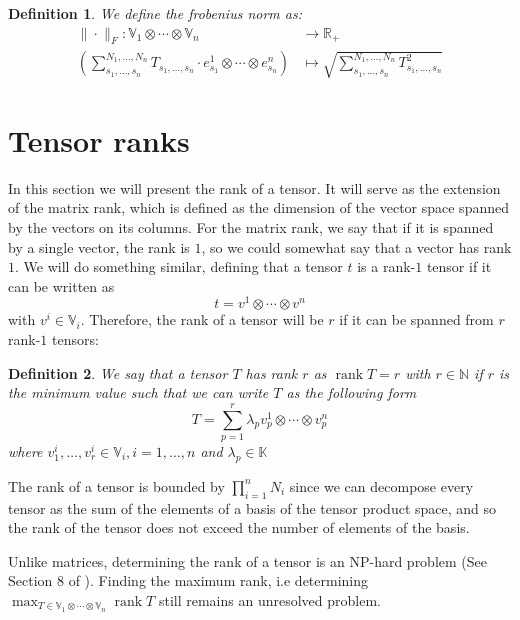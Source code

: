 \documentclass[11pt,a4paper,openright,oneside]{book}
\numberwithin{equation}{section}
\newtheorem{defn0}{Definition}[chapter]
\newenvironment{definition}{ \begin{defn0}}{\end{defn0}}
\DeclareMathOperator{\rank}{rank}
\begin{document}
\begin{definition}
    We define the frobenius norm as:
    $$\begin{align}
        \| \cdot \|_F : \mathbb{V}_1 \otimes \cdots \otimes \mathbb{V}_n & \longrightarrow \mathbb{R}_+ \\
        \left( \sum_{s_1, \dots, s_n}^{N_1, \dots, N_n} T_{s_1, \dots, s_n} \cdot e_{s_1}^1 \otimes \cdots \otimes e_{s_n}^n \right) & \longmapsto 
        \sqrt{\sum_{s_1, \dots, s_n}^{N_1, \dots, N_n} T_{s_1, \dots, s_n}^2}
    \end{align}$$
\end{definition}

\section{Tensor ranks}

In this section we will present the rank of a tensor. It will serve as the extension of the
matrix rank, which is defined as the dimension of the vector space spanned by the vectors
on its columns. For the matrix rank, we say that if it is spanned by a single vector, the rank is $1$, so
we could somewhat say that a vector has rank $1$. We will do something similar, defining
that a tensor $t$ is a rank-$1$ tensor if it can be written as $$t = v^1 \otimes \cdots \otimes v^n$$
with $v^i \in \mathbb{V}_i$. Therefore, the rank of a tensor will be $r$ if it can be spanned from $r$ rank-$1$ tensors:

\begin{definition}
    We say that a tensor $T$ has rank $r$ as $\rank{T} = r$ with 
    $r \in \mathbb{N}$ if $r$ is the minimum value such that we can write $T$ as the following form
    \begin{equation}
        T= \sum_{p=1}^r \lambda_p v_p^1 \otimes \cdots \otimes v_p^n
        \label{eq:rank}
    \end{equation}
    where $v_1^i, \dots, v_r^i \in \mathbb{V}_i, i = 1, \dots, n$ and $\lambda_p \in \mathbb{K}$
\end{definition}

The rank of a tensor is bounded by $\prod_{i=1}^n N_i$ since we can decompose every tensor as the sum
of the elements of a basis of the tensor product space, and so the rank of the tensor does not exceed the number
of elements of the basis.

Unlike matrices, determining the rank of a tensor is an NP-hard problem (See Section 8 of \cite{hillarMostTensorProblems2013}).
Finding the maximum rank, i.e determining $\displaystyle\max_{T \in \mathbb{V}_1 \otimes \cdots \otimes \mathbb{V}_n} \rank{T}$ still remains an unresolved problem.
\cite{christandlTensorRankNot2018}
\end{document}
